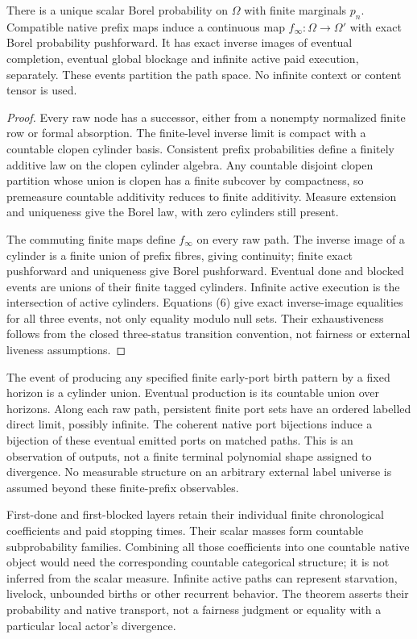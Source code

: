 \documentclass[11pt]{article}
\begin{document}
\begin{theorem}
There is a unique scalar Borel probability on $\Omega$ with finite marginals $p_n$. Compatible native prefix maps induce a continuous map $f_\infty:\Omega\to\Omega'$ with exact Borel probability pushforward. It has exact inverse images of eventual completion, eventual global blockage and infinite active paid execution, separately. These events partition the path space. No infinite context or content tensor is used.
\end{theorem}
\begin{proof}
Every raw node has a successor, either from a nonempty normalized finite row or formal absorption. The finite-level inverse limit is compact with a countable clopen cylinder basis. Consistent prefix probabilities define a finitely additive law on the clopen cylinder algebra. Any countable disjoint clopen partition whose union is clopen has a finite subcover by compactness, so premeasure countable additivity reduces to finite additivity. Measure extension and uniqueness give the Borel law, with zero cylinders still present.

The commuting finite maps define $f_\infty$ on every raw path. The inverse image of a cylinder is a finite union of prefix fibres, giving continuity; finite exact pushforward and uniqueness give Borel pushforward. Eventual done and blocked events are unions of their finite tagged cylinders. Infinite active execution is the intersection of active cylinders. Equations (6) give exact inverse-image equalities for all three events, not only equality modulo null sets. Their exhaustiveness follows from the closed three-status transition convention, not fairness or external liveness assumptions.\end{proof}

The event of producing any specified finite early-port birth pattern by a fixed horizon is a cylinder union. Eventual production is its countable union over horizons. Along each raw path, persistent finite port sets have an ordered labelled direct limit, possibly infinite. The coherent native port bijections induce a bijection of these eventual emitted ports on matched paths. This is an observation of outputs, not a finite terminal polynomial shape assigned to divergence. No measurable structure on an arbitrary external label universe is assumed beyond these finite-prefix observables.

First-done and first-blocked layers retain their individual finite chronological coefficients and paid stopping times. Their scalar masses form countable subprobability families. Combining all those coefficients into one countable native object would need the corresponding countable categorical structure; it is not inferred from the scalar measure. Infinite active paths can represent starvation, livelock, unbounded births or other recurrent behavior. The theorem asserts their probability and native transport, not a fairness judgment or equality with a particular local actor's divergence.
\end{document}
